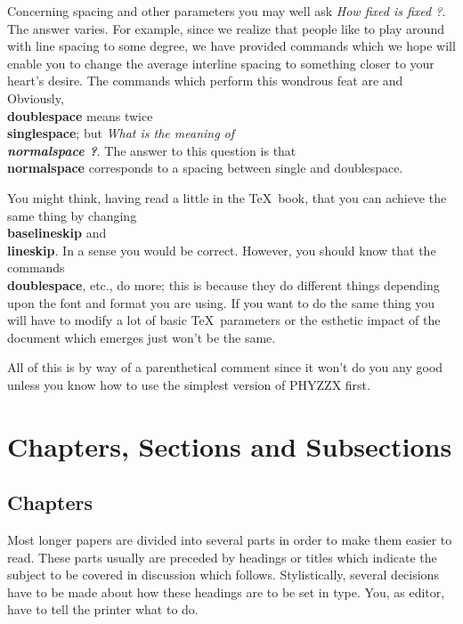 Concerning spacing and other parameters you may well ask
{\it How fixed is fixed ?\/}.
The answer varies.
For example,
since we realize that people like to play around with line spacing
to some degree, we have provided commands which we hope will
enable you to change the average interline spacing to
something closer to your heart's desire.
The commands which perform this wondrous feat are
\tc{\\singlespace}
\tcon{\\doublespace}
and
\tc{\\normalspace}
Obviously, {\bf \\doublespace} means twice {\bf \\singlespace};
but {\it What is the meaning of \bf \\normalspace \it ?\/}.
The answer to this question is that {\bf \\normalspace}
corresponds to a spacing between single and doublespace.
 
You might think, having read a little in the \TeX\ book,
that you can achieve the same thing by changing {\bf \\baselineskip}
and {\bf \\lineskip}.
In a sense you would be correct.
However, you should know that the commands {\bf \\doublespace}, etc.,
do more; this is because
they do different things depending upon the font and
format you are using.
If you want to do the same thing you will have to modify
a lot of basic \TeX\ parameters or the esthetic impact of the
document which emerges just won't be the same.
 
All of this is by way of a parenthetical comment since it won't
do you any good unless you know how to use the simplest version
of PHYZZX first.
 
\section{Chapters, Sections and Subsections}
 
\subsection{Chapters}
 
Most longer papers are divided into several parts in order
to make them easier to read.
These parts usually are preceded by headings or titles
which indicate the subject to be covered in discussion which follows.
Stylistically, several decisions have to be made about how
these headings are to be set in type.
You, as editor, have to tell the printer what to do.
 
